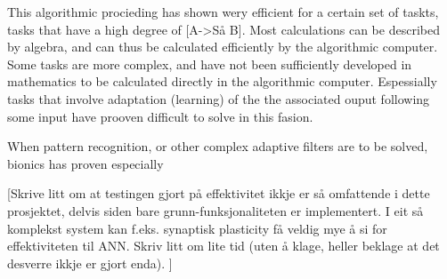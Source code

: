 This algorithmic procieding has shown wery efficient for a certain set of taskts, tasks that have a high degree of [A->Så B]. 
Most calculations can be described by algebra, and can thus be calculated efficiently by the algorithmic computer.
Some tasks are more complex, and have not been sufficiently developed in mathematics to be calculated directly in the algorithmic computer.
Espessially tasks that involve adaptation (learning) of the the associated ouput following some input have prooven difficult to solve in this fasion.

When pattern recognition, or other complex adaptive filters are to be solved, bionics has proven especially 














[Skrive litt om at testingen gjort på effektivitet ikkje er så omfattende i dette prosjektet, delvis siden bare grunn-funksjonaliteten er implementert.
I eit så komplekst system kan f.eks. synaptisk plasticity få veldig mye å si for effektiviteten til ANN. Skriv litt om lite tid (uten å klage, heller beklage at det desverre ikkje er gjort enda).
]

